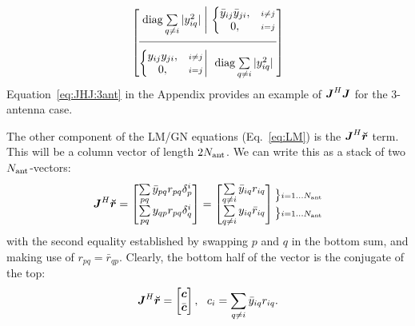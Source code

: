 \documentclass[useAMS,usenatbib]{mn2e}
\makeatletter
\newcommand{\mat}[1]{{\bmath{#1}}}
\newcommand{\JJ}{\mat{J}} %
\newcommand{\Matrix}[2]{\left [ \begin{array}{@{}#1@{}}#2\end{array} \right ]}
\newcommand{\Stack}[1]{\begin{array}{@{}c@{}}#1\end{array}}
\newcommand{\AUG}[1]{\bmath{\breve{#1}}}
\newcommand{\Rr}{\AUG{r}}
\numberwithin{equation}{section}
\makeatother
\begin{document}
\begin{equation}%
\JHJblocksFull{
\mathrm{diag} \sum\limits_{q\ne i} |y_{iq}^2| 
}{
  \left \{ 
  \begin{array}{@{}cc@{}}
   \bar{y}_{ij} \bar{y}_{ji}, &{\scriptstyle i\ne j} \\
   0, &{\scriptstyle i=j}
  \end{array} \right .
}{
  \left \{ 
  \begin{array}{@{}cc@{}}
   y_{ij}y_{ji},&{\scriptstyle i\ne j} \\
   0, &{\scriptstyle i=j}
  \end{array} \right . 
}{
  \mathrm{diag} \sum\limits_{q\ne i} |y^2_{iq}| 
}
\end{equation}
Equation~\ref{eq:JHJ:3ant} in the Appendix provides an example of $\JJ^H\JJ$ for the 3-antenna case. 

\newcommand{\yysq}[2]{{y^2_{#1}+y^2_{#2}}}
\newcommand{\bb}[2]{{\bar{y}_{#1#2}\bar{y}_{#2#1}}}
\newcommand{\bbb}[2]{y_{#1#2}y_{#2#1}}

The other component of the LM/GN equations (Eq.~\ref{eq:LM}) is the $\JJ^H\Rr$ term. This will be a column vector of length $2N_\mathrm{ant}$. We can write this as a stack of two $N_\mathrm{ant}$-vectors:
\begin{equation}
\label{eq:JHR:DI}
\JJ^H\Rr = \Matrix{c}{ 
\sum\limits_{pq} \bar{y}_{pq} r_{pq} \delta^{i}_p  \\
\sum\limits_{pq} y_{qp} r_{pq} \delta^{i}_q 
} = \Matrix{c}{
\sum\limits_{q\ne i} \bar{y}_{iq} r_{iq}   \\
\sum\limits_{q\ne i} y_{iq} \bar{r}_{iq}  
}
\Stack{
\bm{\big\}} \scriptstyle i=1\dots \Na \\[1ex] 
\bm{\big\}} \scriptstyle i=1\dots \Na
}
\end{equation}
with the second equality established by swapping $p$ and $q$ in the bottom sum, and making use of $r_{pq}=\bar{r}_{qp}$. Clearly, the bottom half of the vector is the conjugate of the top:
\begin{equation}
\label{eq:JHR:DI1}
\JJ^H\Rr = \Matrix{c}{\bmath{c}\\\bar{\bmath{c}}},~~c_i = \sum\limits_{q\ne i} \bar{y}_{iq} r_{iq}.
\end{equation}
\end{document}
